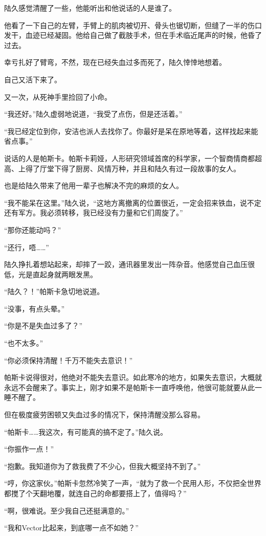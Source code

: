 陆久感觉清醒了一些，他能听出和他说话的人是谁了。

他看了一下自己的左臂，手臂上的肌肉被切开、骨头也锯切断，但缝了一半的伤口发干，血迹已经凝固。他给自己做了截肢手术，但在手术临近尾声的时候，他昏了过去。

幸亏扎好了臂弯，不然，现在已经失血过多而死了，陆久悻悻地想着。

自己又活下来了。

又一次，从死神手里捡回了小命。

“我还好。”陆久虚弱地说道，“我受了点伤，但是还活着。”

“我已经定位到你，安洁也派人去找你了。你最好是呆在原地等着，这样找起来能省点事。”

说话的人是帕斯卡。帕斯卡莉娅，人形研究领域首席的科学家，一个智商情商都超高、上得了厅堂下得了厨房、风情万种，并且和陆久有过一段故事的女人。

也是给陆久带来了他用一辈子也解决不完的麻烦的女人。

“我不能呆在这里。”陆久说，“这地方离撤离的位置很近，一定会招来铁血，说不定还有军方。我必须转移，我已经没有力量和它们周旋了。”

“那你还能动吗？”

“还行，唔……”

陆久挣扎着想站起来，却摔了一跤，通讯器里发出一阵杂音。他感觉自己血压很低，光是直起身就两眼发黑。

“陆久？！”帕斯卡急切地说道。

“没事，有点头晕。”

“你是不是失血过多了？”

“也不太多。”

“你必须保持清醒！千万不能失去意识！”

帕斯卡说得很对，他绝对不能失去意识。如此寒冷的地方，如果失去意识，大概就永远不会醒来了。事实上，刚才如果不是帕斯卡一直呼唤他，他很可能就要从此一睡不醒了。

但在极度疲劳困顿又失血过多的情况下，保持清醒没那么容易。

“帕斯卡……我这次，有可能真的搞不定了。”陆久说。

“你振作一点！”

“抱歉。我知道你为了救我费了不少心，但我大概坚持不到了。”

“哼，你这家伙。”帕斯卡忽然冷笑了一声，“就为了救一个民用人形，不仅把全世界都搅了个天翻地覆，就连自己的命都要搭上了，值得吗？”

“啊，很难说。至少我自己还挺满意的。”

“我和Vector比起来，到底哪一点不如她？”

